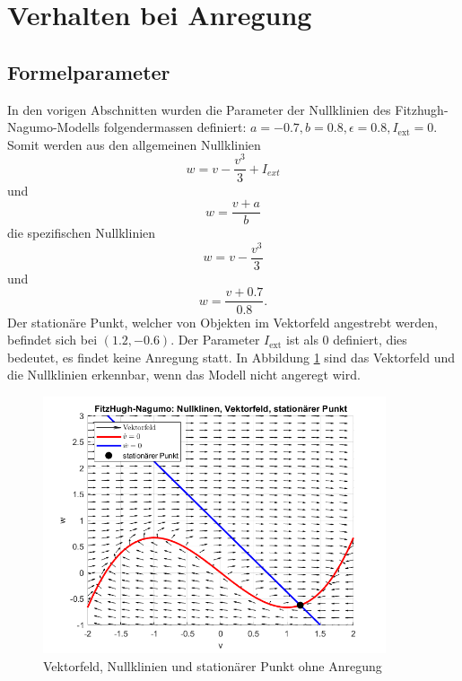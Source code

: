 \section{Verhalten bei Anregung}
%
\subsection{Formelparameter}
In den vorigen Abschnitten wurden die Parameter der Nullklinien des Fitzhugh-Nagumo-Modells folgendermassen definiert:
\(a = -0.7, b = 0.8, \epsilon = 0.8, I_\text{ext} = 0\). Somit werden aus den allgemeinen Nullklinien \[ w = v - \frac{v^3}{3} + I_{ext}\]
und \[w = \frac{v + a}{b}\] die spezifischen Nullklinien \[ w = v - \frac{v^3}{3}\]
und \[w = \frac{v + 0.7}{0.8}.\]
Der stationäre Punkt, welcher von Objekten im Vektorfeld angestrebt werden, befindet sich bei $(1.2 ,-0.6)$.
Der Parameter $I_\text{ext}$ ist als 0 definiert, dies bedeutet, es findet keine Anregung statt.
In Abbildung \ref{fig:Parameter} sind das Vektorfeld und die Nullklinien erkennbar, wenn das Modell nicht angeregt wird.
\begin{figure}
    \centering
    \includegraphics[width=0.9\textwidth]{papers/nerven/Bilder/Anregung1.png}
    \caption{Vektorfeld, Nullklinien und stationärer Punkt ohne Anregung}
    \label{fig:Parameter}
\end{figure}
